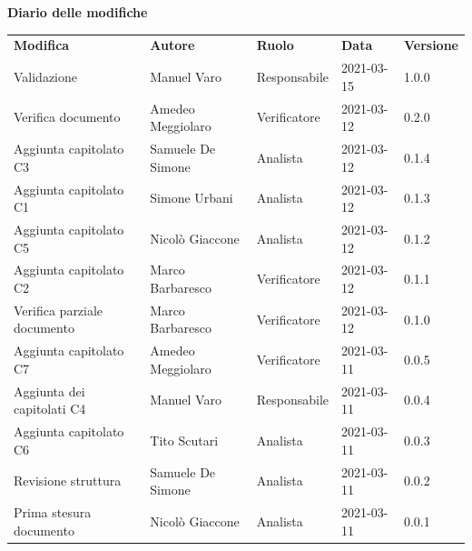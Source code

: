 \documentclass[a4paper]{article}
\begin{document}
\begin{center}

    \textbf{\Large Diario delle modifiche}\\
    \vspace{10px}
    \begin{table}[h!]
        \centering
        \renewcommand{\arraystretch}{1.8}
        \begin{tabular}{p{140px} p{100px} p{60px} p{60px} p{50px}}
            \rowcolor{logo!70} \textbf{Modifica} & \textbf{Autore}   & \textbf{Ruolo} & \textbf{Data} & \textbf{Versione} \\
            Validazione                          & Manuel Varo       & Responsabile   & 2021-03-15    & 1.0.0             \\
            Verifica documento                   & Amedeo Meggiolaro & Verificatore   & 2021-03-12    & 0.2.0             \\
            Aggiunta capitolato C3               & Samuele De Simone & Analista       & 2021-03-12    & 0.1.4             \\
            Aggiunta capitolato C1               & Simone Urbani     & Analista       & 2021-03-12    & 0.1.3             \\
            Aggiunta capitolato C5               & Nicolò Giaccone   & Analista       & 2021-03-12    & 0.1.2             \\
            Aggiunta capitolato C2               & Marco Barbaresco  & Verificatore   & 2021-03-12    & 0.1.1             \\
            Verifica parziale documento          & Marco Barbaresco  & Verificatore   & 2021-03-12    & 0.1.0             \\
            Aggiunta capitolato C7               & Amedeo Meggiolaro & Verificatore   & 2021-03-11    & 0.0.5             \\
            Aggiunta dei capitolati C4           & Manuel Varo       & Responsabile   & 2021-03-11    & 0.0.4             \\
            Aggiunta capitolato C6               & Tito Scutari      & Analista       & 2021-03-11    & 0.0.3             \\
            Revisione struttura                  & Samuele De Simone & Analista       & 2021-03-11    & 0.0.2             \\
            Prima stesura documento              & Nicolò Giaccone   & Analista       & 2021-03-11    & 0.0.1             \\
        \end{tabular}
    \end{table}
\end{center}
\newpage
\tableofcontents
\newpage








\end{document}

